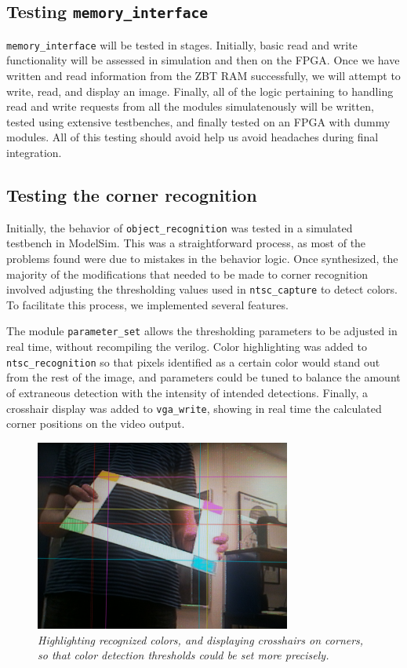 \documentclass[10pt]{article}
\begin{document}
\subsection{Testing {\tt memory\_interface}}
{\tt memory\_interface} will be tested in stages. Initially, basic read and write functionality will be assessed in simulation and then on the FPGA. Once we have written and read information from the ZBT RAM successfully, we will attempt to write, read, and display an image. Finally, all of the logic pertaining to handling read and write requests from all the modules simulatenously will be written, tested using extensive testbenches, and finally tested on an FPGA with dummy modules. All of this testing should avoid help us avoid headaches during final integration.

\subsection{Testing the corner recognition}

Initially, the behavior of {\tt object\_recognition} was tested in a simulated testbench in ModelSim. This was a straightforward process, as most of the problems found were due to mistakes in the behavior logic. Once synthesized, the majority of the modifications that needed to be made to corner recognition involved adjusting the thresholding values used in {\tt ntsc\_capture} to detect colors. To facilitate this process, we implemented several features.

The module {\tt parameter\_set} allows the thresholding parameters to be adjusted in real time, without recompiling the verilog. Color highlighting was added to {\tt ntsc\_recognition} so that pixels identified as a certain color would stand out from the rest of the image, and parameters could be tuned to balance the amount of extraneous detection with the intensity of intended detections. Finally, a crosshair display was added to {\tt vga\_write}, showing in real time the calculated corner positions on the video output.

\begin{figure}[h!]
\centering
\includegraphics[width=0.75\textwidth]{images/IMG_0131.JPG}
\caption{\emph{Highlighting recognized colors, and displaying crosshairs on corners, so that color detection thresholds could be set more precisely.}}
\end{figure}
\end{document}
